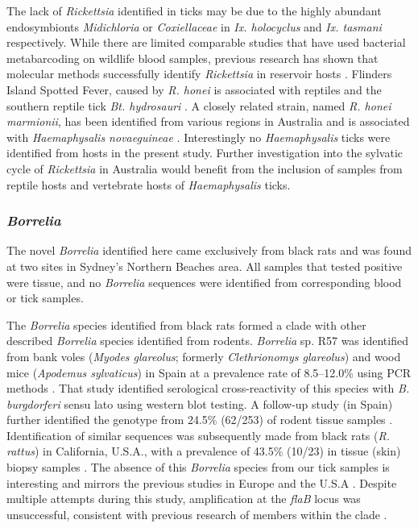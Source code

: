 \documentclass[a4paper, nobind]{templates/ociamthesis}
\begin{document}
The lack of \emph{Rickettsia} identified in ticks may be due to the highly abundant endosymbionts \emph{Midichloria} or \emph{Coxiellaceae} in \emph{Ix. holocyclus} and \emph{Ix. tasmani} respectively.
While there are limited comparable studies that have used bacterial metabarcoding on wildlife blood samples, previous research has shown that molecular methods successfully identify \emph{Rickettsia} in reservoir hosts \autocite{ndeerehMolecularSurveillanceSpotted2017,martelloBorreliaBurgdorferiSensu2019,chaorattanakaweeAmpliconBasedNextGeneration2021}. Flinders Island Spotted Fever, caused by \emph{R. honei} is associated with reptiles and the southern reptile tick \emph{Bt. hydrosauri} \autocite{stenosAponommaHydrosauriReptileassociated2003}.
A closely related strain, named \emph{R. honei marmionii}, has been identified from various regions in Australia and is associated with \emph{Haemaphysalis novaeguineae} \autocite{laneEvidenceSpottedFeverlike2005a,unsworthFlindersIslandSpotted2007}.
Interestingly no \emph{Haemaphysalis} ticks were identified from hosts in the present study.
Further investigation into the sylvatic cycle of \emph{Rickettsia} in Australia would benefit from the inclusion of samples from reptile hosts and vertebrate hosts of \emph{Haemaphysalis} ticks.

\hypertarget{borrelia-3}{%
\subsubsection{\texorpdfstring{\emph{Borrelia}}{Borrelia}}\label{borrelia-3}}

The novel \emph{Borrelia} identified here came exclusively from black rats and was found at two sites in Sydney's Northern Beaches area. All samples that tested positive were tissue, and no \emph{Borrelia} sequences were identified from corresponding blood or tick samples.

The \emph{Borrelia} species identified from black rats formed a clade with other described \emph{Borrelia} species identified from rodents. \emph{Borrelia} sp. R57 was identified from bank voles (\emph{Myodes glareolus}; formerly \emph{Clethrionomys glareolus}) and wood mice (\emph{Apodemus sylvaticus}) in Spain at a prevalence rate of 8.5--12.0\% using PCR methods \autocite{gilIdentificationNewBorrelia2005}.
That study identified serological cross-reactivity of this species with \emph{B. burgdorferi} sensu lato using western blot testing.
A follow-up study (in Spain) further identified the genotype from 24.5\% (62/253) of rodent tissue samples \autocite{barandikaTickBorneZoonoticBacteria2007}.
Identification of similar sequences was subsequently made from black rats (\emph{R. rattus}) in California, U.S.A., with a prevalence of 43.5\% (10/23) in tissue (skin) biopsy samples \autocite{fedorovaRemarkableDiversityTick2014}.
The absence of this \emph{Borrelia} species from our tick samples is interesting and mirrors the previous studies in Europe and the U.S.A \autocite{gilIdentificationNewBorrelia2005,fedorovaRemarkableDiversityTick2014}.
Despite multiple attempts during this study, amplification at the \emph{flaB} locus was unsuccessful, consistent with previous research of members within the clade \autocite{gilIdentificationNewBorrelia2005}.
\end{document}
